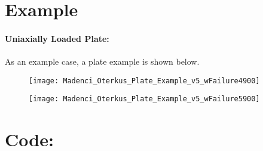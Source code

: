 \documentclass[10pt,a4paper,onecolumn]{article}
\begin{document}
\section{Example}
\paragraph{Uniaxially Loaded Plate:} As an example case, a plate example is shown below. 

\begin{figure}[h!]
\texttt{[image: Madenci\_Oterkus\_Plate\_Example\_v5\_wFailure4900]}
\end{figure}
\begin{figure}[h!]
\texttt{[image: Madenci\_Oterkus\_Plate\_Example\_v5\_wFailure5900]}
\end{figure}



\pagebreak
\section{Code:}
\end{document}
